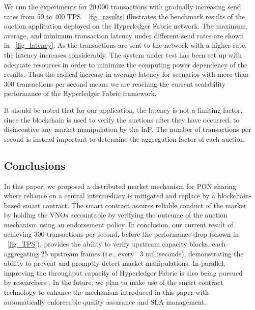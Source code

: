 

We run the experiments for 20,000 transactions with gradually increasing send rates from 50 to 400 \ac{TPS}. \figureautorefname~\ref{fig_results} illustrates the benchmark results of the auction application deployed on the Hyperledger Fabric network. The maximum, average, and minimum transaction latency under different send rates are shown in \figureautorefname~\ref{fig_latency}. As the transactions are sent to the network with a higher rate, the latency increases considerably. The system under test has been set up with adequate resources in order to minimize the computing power dependency of the results. Thus the radical increase in average latency for scenarios with more than 300 transactions per second means we are reaching the current scalability performance of the Hyperledger Fabric framework. %

It should be noted that for our application, the latency is not a limiting factor, since the blockchain is used to verify the auctions after they have occurred, to disincentive any market manipulation by the \ac{InP}. The number of transactions per second is instead important to determine the aggregation factor of each auction. 

\subsection{Conclusions}
In this paper, we proposed a distributed market mechanism for \ac{PON} sharing where reliance on a central intermediary is mitigated and replace by a blockchain-based smart contract. The smart contract assures reliable conduct of the market by holding the \acp{VNO} accountable by verifying the outcome of the auction mechanism using an endorsement policy.
In conclusion, our current result of achieving 300 transactions per second, before the performance drop (shown in \figureautorefname~\ref{fig_TPS}), provides the ability to verify upstream capacity blocks, each aggregating 25 upstream frames (i.e., every ~3 milliseconds), demonstrating the ability to prevent and promptly detect market manipulations.
In parallel, improving the throughput capacity of Hyperledger Fabric is also being pursued by researchers \cite{Gorenflo_2019}. In the future, we plan to make use of the smart contract technology to enhance the mechanism introduced in this paper with automatically enforceable quality assurance and \ac{SLA} management.






